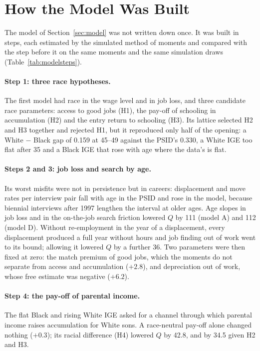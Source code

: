 \section{How the Model Was Built}\label{app:modelsteps}

The model of Section~\ref{sec:model} was not written down once. It was built in steps, each estimated by the
simulated method of moments and compared with the step before it on the same moments and the same simulation draws
(Table~\ref{tab:modelsteps}).



\paragraph{Step 1: three race hypotheses.} The first model had race in the wage level and in job loss, and three
candidate race parameters: access to good jobs (H1), the pay-off of schooling in accumulation (H2) and the entry return
to schooling (H3). Its lattice selected H2 and H3 together and rejected H1, but it reproduced only half of the opening:
a White $-$ Black gap of 0.159 at 45--49 against the PSID's 0.330, a White IGE too flat after 35 and a Black IGE that rose
with age where the data's is flat.

\paragraph{Steps 2 and 3: job loss and search by age.} Its worst misfits were not in persistence but in careers:
displacement and move rates per interview pair fall with age in the PSID and rose in the model, because biennial
interviews after 1997 lengthen the interval at older ages. Age slopes in job loss and in the on-the-job search friction
lowered $Q$ by 111 (model A) and 112 (model D). Without re-employment in the year of a displacement, every displacement
produced a full year without hours and job finding out of work went to its bound; allowing it lowered $Q$ by a further 36.
Two parameters were then fixed at zero: the match premium of good jobs, which the moments do not separate from access and
accumulation ($+2.8$), and depreciation out of work, whose free estimate was negative ($+6.2$).

\paragraph{Step 4: the pay-off of parental income.} The flat Black and rising White IGE asked for a channel through
which parental income raises accumulation for White sons. A race-neutral pay-off alone changed nothing ($+0.3$); its
racial difference (H4) lowered $Q$ by 42.8, and by 34.5 given H2 and H3.

